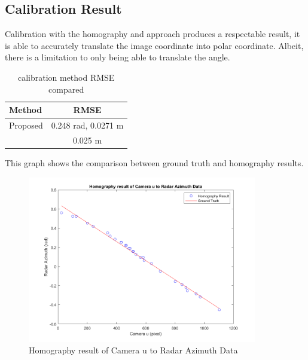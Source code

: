 \subsection{Calibration Result}\label{subsec:2-3-calibration-result}
Calibration with the homography and approach produces a respectable result, 
it is able to accurately translate the image coordinate into polar coordinate.
Albeit, there is a limitation to only being able to translate the angle.
\begin{table}[h!]
    \begin{center}
      \label{tab:table4}
      \begin{tabular}{l|c} %
        \textbf{Method} & \textbf{RMSE} \\%
        \hline
        Proposed                            & 0.248 rad, 0.0271 m \\%
        \citeauthor{8794186}\cite{8794186}  & 0.025 m \\%
      \end{tabular}
    \end{center}
    \caption{calibration method RMSE compared}
    \label{tab:callib_rmse}
  \end{table}
This graph shows the comparison between ground truth and homography results.

\begin{figure}[hpbt]
    \centering
    \includegraphics[width=10cm]{Figures/matlab/homography_result.png}%
    \caption{Homography result of Camera u to Radar Azimuth Data}
    \label{fig:homography_result}
\end{figure}
\newpage
